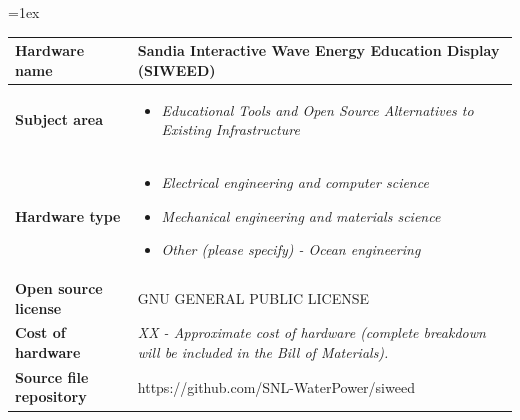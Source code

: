 \documentclass[11pt, letterpaper]{article}
\begin{document}
\begin{flushleft}
\tabulinesep=1ex
\begin{tabu} to \linewidth {|X|X[3,l]|}
\hline  \textbf{Hardware name} & Sandia Interactive Wave Energy Education Display (SIWEED)
  \\
  \hline \textbf{Subject area} & %
  \begin{itemize}
  \item \textit{Educational Tools and Open Source Alternatives to Existing Infrastructure}
  \end{itemize}
  \\
  \hline \textbf{Hardware type} &
  \begin{itemize}
  \item \textit{Electrical engineering and computer science}
  \item \textit{Mechanical engineering and materials science}
  \item \textit{Other (please specify) - Ocean engineering}
  \end{itemize}
  \\ 
\hline \textbf{Open source license} &
  GNU GENERAL PUBLIC LICENSE
  \\
\hline \textbf{Cost of hardware} &
  \textit{XX - Approximate cost of hardware (complete breakdown will be included in the Bill of Materials).}
  \\
\hline \textbf{Source file repository} & 
  https://github.com/SNL-WaterPower/siweed
\\\hline
\end{tabu}
 
\end{flushleft}
\end{document}
